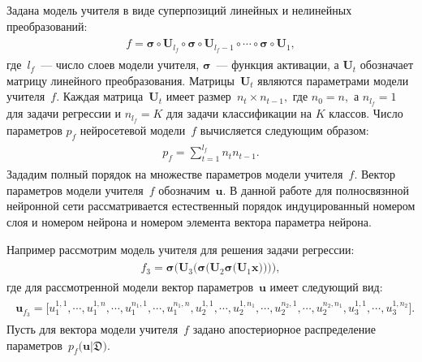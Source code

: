 \documentclass[12pt]{a&t}
\begin{document}
Задана модель учителя в виде суперпозиций линейных и нелинейных преобразований:
\begin{gather}
\label{eq:st:2}
\begin{aligned}
f = \bm{\sigma} \circ \mathbf{U}_{l_f} \circ \bm{\sigma} \circ \mathbf{U}_{{l_f}-1} \circ \cdots \circ \bm{\sigma} \circ \mathbf{U}_1,
\end{aligned}
\end{gather}
где~${l_f}$~--- число слоев модели учителя, $\bm{\sigma}$~--- функция активации, а $\mathbf{U}_t$ обозначает матрицу линейного преобразования. Матрицы~$\mathbf{U}_t$ являются параметрами модели учителя~$f$. Каждая матрица~$\mathbf{U}_t$ имеет размер~$n_t\times n_{t-1},$ где $n_0=n,$ а  $n_{l_f}={1}$ для задачи регрессии и $n_{l_f}=K$ для задачи классификации на $K$ классов. Число параметров $p_f$ нейросетевой модели~$f$ вычисляется следующим образом:
\begin{gather}
\label{eq:st:2}
\begin{aligned}
p_f = \sum_{t=1}^{{l_f}}n_tn_{t-1}.
\end{aligned}
\end{gather}
Зададим полный порядок на множестве параметров модели учителя~$f$. Вектор параметров модели учителя~$f$ обозначим~$\mathbf{u}$. В данной работе для полносвязнной нейронной сети рассматривается естественный порядок индуцированный номером слоя и номером нейрона и номером элемента вектора параметра нейрона.

Например рассмотрим модель учителя для решения задачи регрессии:
\begin{gather}
\label{eq:st:3}
\begin{aligned}
f_{3} = \bm{\sigma}\bigr(\mathbf{U}_3\bigr(\bm{\sigma}\bigr(\mathbf{U}_2\bm{\sigma}\bigr(\mathbf{U}_1\mathbf{x}\bigr)\bigr)\bigr)\bigr),
\end{aligned}
\end{gather}
где для рассмотренной модели вектор параметров~$\mathbf{u}$ имеет следующий вид:
\begin{gather}
\label{eq:st:4}
\begin{aligned}
\mathbf{u}_{f_3} = \bigr[u_1^{1,1}, \cdots, u_1^{1,n},
                                               \cdots, 
                             u_1^{n_1,1}, \cdots, u_1^{n_1,n},  
                             u_2^{1, 1}, \cdots, u_2^{1, n_1}, 
                                                \cdots, 
                            u_2^{n_2, 1}, \cdots, u_2^{n_2, n_1},
                            u_3^{1, 1}, \cdots, u_3^{1, n_2}\bigr].
\end{aligned}
\end{gather}
Пусть для вектора модели учителя~$f$ задано апостериорное распределение параметров~$p_f\bigr(\mathbf{u}|\mathfrak{D}\bigr).$
\end{document}
